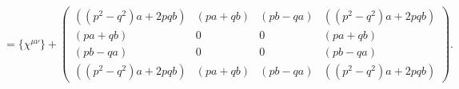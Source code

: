 \begin{equation}
 = \{\chi^{\mu\nu}\} +\left(
\begin{array}{cccc}
((p^2 - q^2)a + 2pqb)  & (pa + qb) & (pb -qa) & ((p^2 - q^2)a + 2pqb) \\
(pa + qb) &0 & 0 & (pa + qb) \\
(pb -qa)  & 0 & 0 & (pb -qa) \\
((p^2 - q^2)a + 2pqb) &( pa + qb) &( pb -qa) & ((p^2 - q^2)a + 2pqb)
\end{array}\right).
\label{544}
\end{equation}

